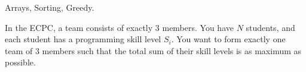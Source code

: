 Arrays, Sorting, Greedy.

In the ECPC, a team consists of exactly 3 members. You have $N$ students, and each student has a programming skill level $S_i$. You want to form exactly one team of 3 members such that the total sum of their skill levels is as maximum as possible.